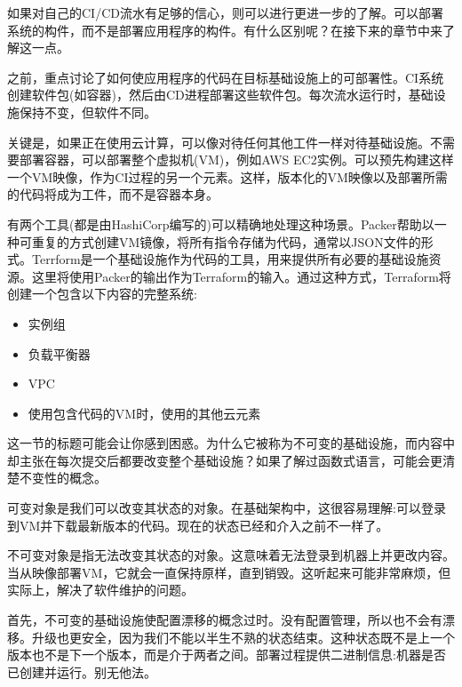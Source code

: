 
如果对自己的CI/CD流水有足够的信心，则可以进行更进一步的了解。可以部署系统的构件，而不是部署应用程序的构件。有什么区别呢？在接下来的章节中来了解这一点。


之前，重点讨论了如何使应用程序的代码在目标基础设施上的可部署性。CI系统创建软件包(如容器)，然后由CD进程部署这些软件包。每次流水运行时，基础设施保持不变，但软件不同。

关键是，如果正在使用云计算，可以像对待任何其他工件一样对待基础设施。不需要部署容器，可以部署整个虚拟机(VM)，例如AWS EC2实例。可以预先构建这样一个VM映像，作为CI过程的另一个元素。这样，版本化的VM映像以及部署所需的代码将成为工件，而不是容器本身。

有两个工具(都是由HashiCorp编写的)可以精确地处理这种场景。Packer帮助以一种可重复的方式创建VM镜像，将所有指令存储为代码，通常以JSON文件的形式。Terrform是一个基础设施作为代码的工具，用来提供所有必要的基础设施资源。这里将使用Packer的输出作为Terraform的输入。通过这种方式，Terraform将创建一个包含以下内容的完整系统:

\begin{itemize}
\item 
实例组

\item 
负载平衡器

\item 
VPC

\item 
使用包含代码的VM时，使用的其他云元素
\end{itemize}

这一节的标题可能会让你感到困惑。为什么它被称为不可变的基础设施，而内容中却主张在每次提交后都要改变整个基础设施？如果了解过函数式语言，可能会更清楚不变性的概念。

可变对象是我们可以改变其状态的对象。在基础架构中，这很容易理解:可以登录到VM并下载最新版本的代码。现在的状态已经和介入之前不一样了。

不可变对象是指无法改变其状态的对象。这意味着无法登录到机器上并更改内容。当从映像部署VM，它就会一直保持原样，直到销毁。这听起来可能非常麻烦，但实际上，解决了软件维护的问题。


首先，不可变的基础设施使配置漂移的概念过时。没有配置管理，所以也不会有漂移。升级也更安全，因为我们不能以半生不熟的状态结束。这种状态既不是上一个版本也不是下一个版本，而是介于两者之间。部署过程提供二进制信息:机器是否已创建并运行。别无他法。

